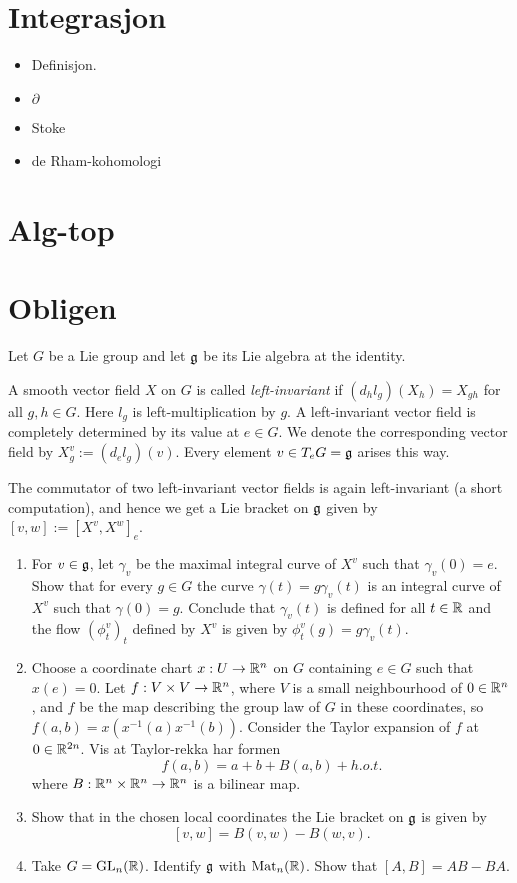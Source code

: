 \documentclass[11pt, english]{article}
\begin{document}
\section{Integrasjon}

\begin{itemize}
\item Definisjon.
\item $\partial$
\item Stoke
\item de Rham-kohomologi
\end{itemize}

\section{Alg-top}



\section{Obligen}

\begin{exc}
Let $G$ be a Lie group and let $\mathfrak g$ be its Lie algebra at the identity.

A smooth vector field $X$ on $G$ is called \emph{left-invariant} if $(d_hl_g)(X_h)=X_{gh}$ for all $g,h \in G$. Here $l_g$ is left-multiplication by $g$. A left-invariant vector field is completely determined by its value at $e \in G$. We denote the corresponding vector field by $X^v_g := (d_el_g)(v)$. Every element $v \in T_e G=\mathfrak g$ arises this way. 

The commutator of two left-invariant vector fields is again left-invariant (a short computation), and hence we get a Lie bracket on $\mathfrak g$ given by $[v,w] := [X^v, X^w]_e$. 

\begin{enumerate}
\item For $v \in \mathfrak g$, let $\gamma_v$ be the maximal integral curve of $X^v$ such that $\gamma_v(0)=e$. Show that for every $g \in G$ the curve $\gamma(t)=g \gamma_v(t)$ is an integral curve of $X^v$ such that $\gamma(0)=g$. Conclude that $\gamma_v(t)$ is defined for all $t \in \mathbb{R}$ and the flow $(\phi_t^v)_t$ defined by $X^v$ is given by $\phi_t^v(g)=g\gamma_v(t)$. 

\item Choose a coordinate chart $x:U \to \mathbb{R}^n$ on $G$ containing $e \in G$ such that $x(e)=0$. Let $f:V \times V \to \mathbb{R}^n$, where $V$ is a small neighbourhood of $0 \in \mathbb{R}^n$, and $f$ be the map describing the group law of $G$ in these coordinates, so $f(a,b)=x(x^{-1}(a)x^{-1}(b))$. Consider the Taylor expansion of $f$ at $0 \in \mathbb{R}^{2n}$. Vis at Taylor-rekka har formen
$$
f(a,b) = a+b+B(a,b)+h.o.t.
$$
where $B:\mathbb{R}^n \times \mathbb{R}^n \to \mathbb{R}^n$ is a bilinear map.

\item Show that in the chosen local coordinates the Lie bracket on $\mathfrak g$ is given by
\[
[v,w] = B(v,w) - B(w,v).
\]
\item Take $G=\operatorname{GL}_n(\mathbb{R})$. Identify $\mathfrak g$ with $\mathrm{Mat}_n(\mathbb{R})$. Show that $[A,B] = AB-BA$.
\end{enumerate}
\end{exc}
\end{document}
